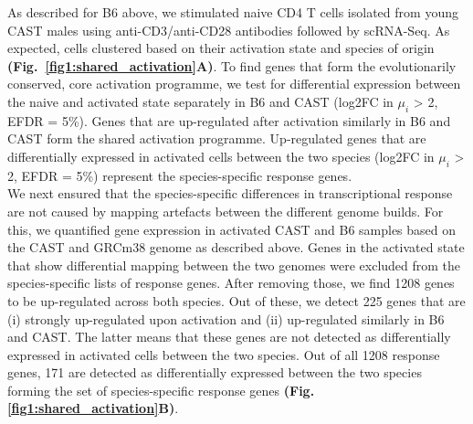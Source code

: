 As described for B6 above, we stimulated naive CD4\plus{} T cells isolated from young CAST males using anti-CD3\textepsilon{}/anti-CD28 antibodies followed by scRNA-Seq. 
As expected, cells clustered based on their activation state and species of origin \textbf{(Fig.~\ref{fig1:shared_activation}A)}. 
To find genes that form the evolutionarily conserved, core activation programme, we test for differential expression between the naive and activated state separately in B6 and CAST (log2FC in $\mu_i$ > 2, EFDR = 5\%). 
Genes that are up-regulated after activation similarly in B6 and CAST form the shared activation programme. 
Up-regulated genes that are differentially expressed in activated cells between the two species (log2FC in $\mu_i$ > 2, EFDR = 5\%) represent the species-specific response genes. \\

We next ensured that the species-specific differences in transcriptional response are not caused by mapping artefacts between the different genome builds. 
For this, we quantified gene expression in activated CAST and B6 samples based on the CAST and GRCm38 genome as described above. 
Genes in the activated state that show differential mapping between the two genomes were excluded from the species-specific lists of response genes. 
After removing those, we find 1208 genes to be up-regulated across both species. Out of these, we detect 225 genes that are (i) strongly up-regulated upon activation and (ii) up-regulated similarly in B6 and CAST. 
The latter means that these genes are not detected as differentially expressed in activated cells between the two species. 
Out of all 1208 response genes, 171 are detected as differentially expressed between the two species forming the set of species-specific response genes \textbf{(Fig. \ref{fig1:shared_activation}B)}.

\newpage

